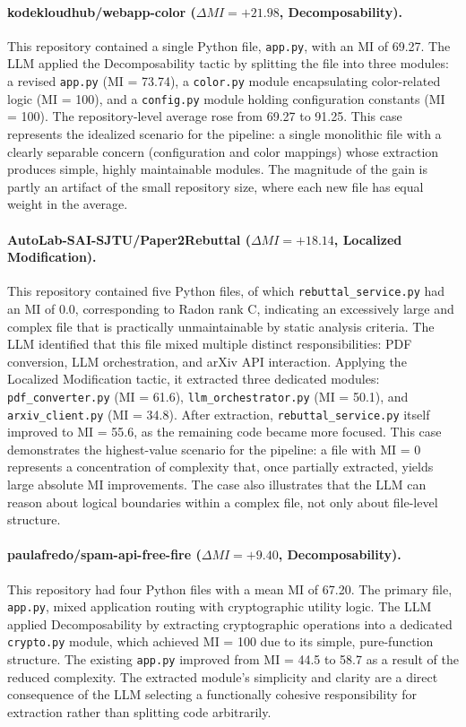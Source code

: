 \documentclass[sigconf,review,anonymous]{acmart}
\begin{document}
\paragraph{kodekloudhub/webapp-color ($\Delta MI = +21.98$, Decomposability).}
This repository contained a single Python file, \texttt{app.py}, with an MI of 69.27. The LLM applied the Decomposability tactic by splitting the file into three modules: a revised \texttt{app.py} (MI = 73.74), a \texttt{color.py} module encapsulating color-related logic (MI = 100), and a \texttt{config.py} module holding configuration constants (MI = 100). The repository-level average rose from 69.27 to 91.25. This case represents the idealized scenario for the pipeline: a single monolithic file with a clearly separable concern (configuration and color mappings) whose extraction produces simple, highly maintainable modules. The magnitude of the gain is partly an artifact of the small repository size, where each new file has equal weight in the average.

\paragraph{AutoLab-SAI-SJTU/Paper2Rebuttal ($\Delta MI = +18.14$, Localized Modification).}
This repository contained five Python files, of which \texttt{rebuttal\_service.py} had an MI of 0.0, corresponding to Radon rank C, indicating an excessively large and complex file that is practically unmaintainable by static analysis criteria. The LLM identified that this file mixed multiple distinct responsibilities: PDF conversion, LLM orchestration, and arXiv API interaction. Applying the Localized Modification tactic, it extracted three dedicated modules: \texttt{pdf\_converter.py} (MI = 61.6), \texttt{llm\_orchestrator.py} (MI = 50.1), and \texttt{arxiv\_client.py} (MI = 34.8). After extraction, \texttt{rebuttal\_service.py} itself improved to MI = 55.6, as the remaining code became more focused. This case demonstrates the highest-value scenario for the pipeline: a file with MI = 0 represents a concentration of complexity that, once partially extracted, yields large absolute MI improvements. The case also illustrates that the LLM can reason about logical boundaries within a complex file, not only about file-level structure.

\paragraph{paulafredo/spam-api-free-fire ($\Delta MI = +9.40$, Decomposability).}
This repository had four Python files with a mean MI of 67.20. The primary file, \texttt{app.py}, mixed application routing with cryptographic utility logic. The LLM applied Decomposability by extracting cryptographic operations into a dedicated \texttt{crypto.py} module, which achieved MI = 100 due to its simple, pure-function structure. The existing \texttt{app.py} improved from MI = 44.5 to 58.7 as a result of the reduced complexity. The extracted module's simplicity and clarity are a direct consequence of the LLM selecting a functionally cohesive responsibility for extraction rather than splitting code arbitrarily.
\end{document}
